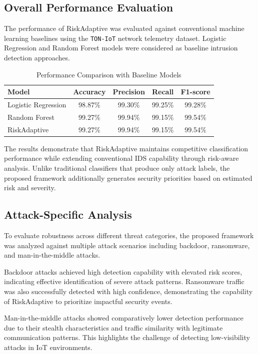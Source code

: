 \subsection{Overall Performance Evaluation}

The performance of RiskAdaptive was evaluated against conventional
machine learning baselines using the \texttt{TON-IoT} network telemetry
dataset. Logistic Regression and Random Forest models were considered
as baseline intrusion detection approaches.

\begin{table}[H]
\caption{Performance Comparison with Baseline Models}
\centering
\begin{tabular}{lcccc}
\toprule
\textbf{Model} &
\textbf{Accuracy} &
\textbf{Precision} &
\textbf{Recall} &
\textbf{F1-score}\\
\midrule
Logistic Regression & 98.87\% & 99.30\% & 99.25\% & 99.28\%\\
Random Forest & 99.27\% & 99.94\% & 99.15\% & 99.54\%\\
RiskAdaptive & 99.27\% & 99.94\% & 99.15\% & 99.54\%\\
\bottomrule
\end{tabular}
\end{table}


The results demonstrate that RiskAdaptive maintains competitive
classification performance while extending conventional IDS capability
through risk-aware analysis. Unlike traditional classifiers that
produce only attack labels, the proposed framework additionally
generates security priorities based on estimated risk and severity.


\subsection{Attack-Specific Analysis}

To evaluate robustness across different threat categories, the proposed
framework was analyzed against multiple attack scenarios including
backdoor, ransomware, and man-in-the-middle attacks.

Backdoor attacks achieved high detection capability with elevated risk
scores, indicating effective identification of severe attack patterns.
Ransomware traffic was also successfully detected with high confidence,
demonstrating the capability of RiskAdaptive to prioritize impactful
security events.

Man-in-the-middle attacks showed comparatively lower detection
performance due to their stealth characteristics and traffic similarity
with legitimate communication patterns. This highlights the challenge
of detecting low-visibility attacks in IoT environments.


